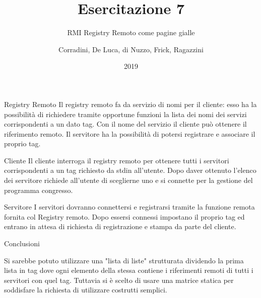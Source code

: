 \documentclass{beamer}
\begin{document}
\title{Esercitazione 7}
\subtitle{RMI Registry Remoto come pagine gialle}
\author{Corradini, De Luca, di Nuzzo, Frick, Ragazzini}
\date{2019}
\begin{frame}
\titlepage
\end{frame}

\begin{frame}{Registry Remoto}
Il registry remoto fa da servizio di nomi per il cliente: esso ha la possibilità di richiedere tramite opportune funzioni la lista dei nomi dei servizi corrispondenti a un dato tag.
Con il nome del servizio il cliente può ottenere il riferimento remoto.
Il servitore ha la possibilità di potersi registrare e associare il proprio tag.
\end{frame}

\begin{frame}{Cliente}
Il cliente interroga il registry remoto per ottenere tutti i servitori corrispondenti a un tag richiesto da stdin all'utente.
Dopo daver ottenuto l'elenco dei servitore richiede all'utente di sceglierne uno e si connette per la gestione del programma congresso.
\end{frame}

\begin{frame}{Servitore}
I servitori dovranno connettersi e registrarsi tramite la funzione remota fornita col Registry remoto.
Dopo essersi connessi impostano il proprio tag ed entrano in attesa di richiesta di registrazione e stampa da parte del cliente.
\end{frame}

\begin{frame}{Conclusioni}

Si sarebbe potuto utilizzare una "lista di liste" strutturata dividendo la prima lista in tag dove ogni elemento della stessa contiene i riferimenti remoti di tutti i servitori con quel tag.
Tuttavia si è scelto di usare una matrice statica per soddisfare la richiesta di utilizzare costrutti semplici.

\end{frame}
\end{document}
